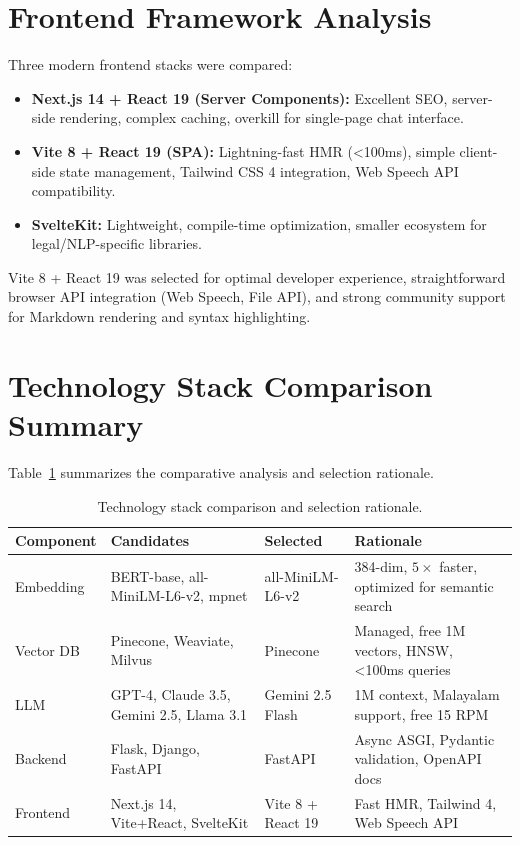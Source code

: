 \documentclass[12pt,a4paper]{report}
\begin{document}
\section{Frontend Framework Analysis}
Three modern frontend stacks were compared:
\begin{itemize}
    \item \textbf{Next.js 14 + React 19 (Server Components):} Excellent SEO, server-side rendering, complex caching, overkill for single-page chat interface.
    \item \textbf{Vite 8 + React 19 (SPA):} Lightning-fast HMR (<100ms), simple client-side state management, Tailwind CSS 4 integration, Web Speech API compatibility.
    \item \textbf{SvelteKit:} Lightweight, compile-time optimization, smaller ecosystem for legal/NLP-specific libraries.
\end{itemize}
Vite 8 + React 19 was selected for optimal developer experience, straightforward browser API integration (Web Speech, File API), and strong community support for Markdown rendering and syntax highlighting.

\section{Technology Stack Comparison Summary}
Table~\ref{tab:tech_comparison} summarizes the comparative analysis and selection rationale.

\begin{table}[H]
\centering
\caption{Technology stack comparison and selection rationale.}
\label{tab:tech_comparison}
\footnotesize
\begin{tabularx}{\textwidth}{l l l X}
\toprule
\textbf{Component} & \textbf{Candidates} & \textbf{Selected} & \textbf{Rationale} \\
\midrule
Embedding & BERT-base, all-MiniLM-L6-v2, mpnet & all-MiniLM-L6-v2 & 384-dim, $5\times$ faster, optimized for semantic search \\
Vector DB & Pinecone, Weaviate, Milvus & Pinecone & Managed, free 1M vectors, HNSW, <100ms queries \\
LLM & GPT-4, Claude 3.5, Gemini 2.5, Llama 3.1 & Gemini 2.5 Flash & 1M context, Malayalam support, free 15 RPM \\
Backend & Flask, Django, FastAPI & FastAPI & Async ASGI, Pydantic validation, OpenAPI docs \\
Frontend & Next.js 14, Vite+React, SvelteKit & Vite 8 + React 19 & Fast HMR, Tailwind 4, Web Speech API \\
\bottomrule
\end{tabularx}
\end{table}
\end{document}
